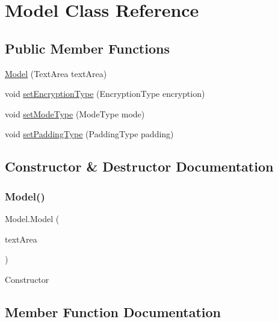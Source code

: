 \hypertarget{class_model}{}\section{Model Class Reference}
\label{class_model}
\subsection*{Public Member Functions}
\begin{DoxyCompactItemize}
\item 
\mbox{\hyperlink{class_model_adc740be264b0c173c4574f42361f1e3a}{Model}} (Text\+Area text\+Area)
\item 
void \mbox{\hyperlink{class_model_a7e8201067bda1c35b779490c46b9590c}{set\+Encryption\+Type}} (Encryption\+Type encryption)
\item 
void \mbox{\hyperlink{class_model_a7b6d65f0bdf44c6d91267b917662fa0c}{set\+Mode\+Type}} (Mode\+Type mode)
\item 
void \mbox{\hyperlink{class_model_ad173621b4a9b3242952a63379062818a}{set\+Padding\+Type}} (Padding\+Type padding)
\end{DoxyCompactItemize}


\subsection{Constructor \& Destructor Documentation}
\mbox{\label{class_model_adc740be264b0c173c4574f42361f1e3a}} 
\subsubsection{\texorpdfstring{Model()}{Model()}}
{\footnotesize\ttfamily Model.\+Model (\begin{DoxyParamCaption}\item[{Text\+Area}]{text\+Area }\end{DoxyParamCaption})}

Constructor 

\subsection{Member Function Documentation}
\mbox{\label{class_model_a7e8201067bda1c35b779490c46b9590c}} 
